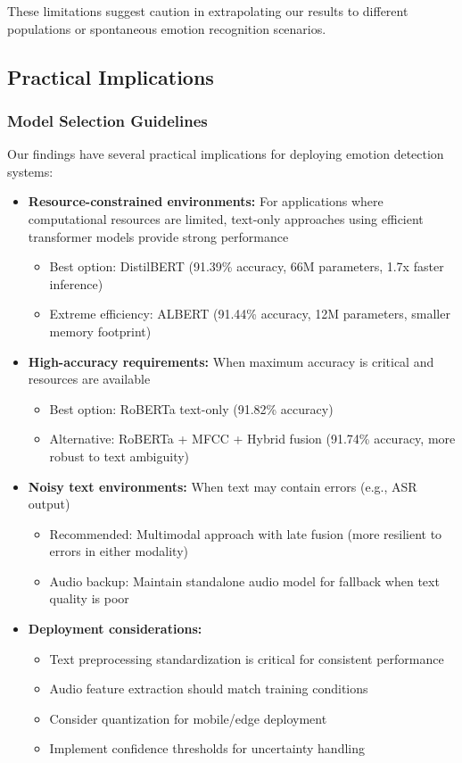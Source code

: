 \documentclass[12pt]{article}
\begin{document}
These limitations suggest caution in extrapolating our results to different populations or spontaneous emotion recognition scenarios.

\subsection{Practical Implications}
\subsubsection{Model Selection Guidelines}
Our findings have several practical implications for deploying emotion detection systems:

\begin{itemize}
    \item \textbf{Resource-constrained environments:} For applications where computational resources are limited, text-only approaches using efficient transformer models provide strong performance
    \begin{itemize}
        \item Best option: DistilBERT (91.39\% accuracy, 66M parameters, 1.7x faster inference)
        \item Extreme efficiency: ALBERT (91.44\% accuracy, 12M parameters, smaller memory footprint)
    \end{itemize}
    
    \item \textbf{High-accuracy requirements:} When maximum accuracy is critical and resources are available
    \begin{itemize}
        \item Best option: RoBERTa text-only (91.82\% accuracy)
        \item Alternative: RoBERTa + MFCC + Hybrid fusion (91.74\% accuracy, more robust to text ambiguity)
    \end{itemize}
    
    \item \textbf{Noisy text environments:} When text may contain errors (e.g., ASR output)
    \begin{itemize}
        \item Recommended: Multimodal approach with late fusion (more resilient to errors in either modality)
        \item Audio backup: Maintain standalone audio model for fallback when text quality is poor
    \end{itemize}
    
    \item \textbf{Deployment considerations:}
    \begin{itemize}
        \item Text preprocessing standardization is critical for consistent performance
        \item Audio feature extraction should match training conditions
        \item Consider quantization for mobile/edge deployment
        \item Implement confidence thresholds for uncertainty handling
    \end{itemize}
\end{itemize}
\end{document}
